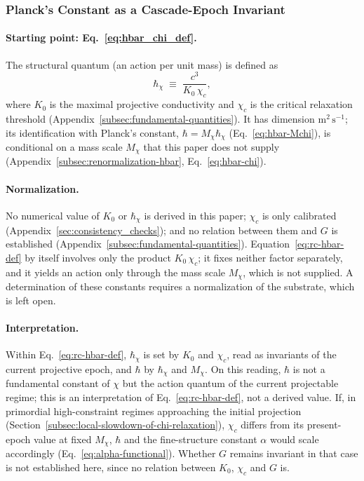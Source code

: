   \subsubsection*{Planck's Constant as a Cascade-Epoch Invariant}
    \label{sec:relax-cascade-hbar}

    \paragraph[Starting point: Eq. hbar-chi-def]{Starting point: Eq.~\eqref{eq:hbar_chi_def}.}
      The structural quantum (an action per unit mass) is defined as
    \begin{equation}
      \label{eq:rc-hbar-def}
      \hbar_\chi
      \;\equiv\;
      \frac{c^3}{K_0\,\chi_c},
      \end{equation}
      where $K_0$ is the maximal projective conductivity and $\chi_c$ is the
      critical relaxation threshold (Appendix~\ref{subsec:fundamental-quantities}).
      It has dimension $\mathrm{m}^2\,\mathrm{s}^{-1}$; its identification with Planck's constant,
      $\hbar = M_\chi\hbar_\chi$ (Eq.~\eqref{eq:hbar-Mchi}), is conditional on a mass scale $M_\chi$ that this paper
      does not supply (Appendix~\ref{subsec:renormalization-hbar}, Eq.~\eqref{eq:hbar-chi}).

    \paragraph{Normalization.}
      No numerical value of $K_0$ or $\hbar_\chi$ is derived in this paper; $\chi_c$ is only calibrated
      (Appendix~\ref{sec:consistency_checks}); and no relation between
      them and $G$ is established (Appendix~\ref{subsec:fundamental-quantities}).
      Equation~\eqref{eq:rc-hbar-def} by itself involves only the product $K_0\,\chi_c$; it fixes neither factor
      separately, and it yields an action only through the mass scale $M_\chi$, which is not supplied.
      A determination of these constants requires a normalization of the substrate, which is left open.

    \paragraph{Interpretation.}
      Within Eq.~\eqref{eq:rc-hbar-def}, $\hbar_\chi$ is set by $K_0$ and $\chi_c$, read as invariants of the
      current projective epoch, and $\hbar$ by $\hbar_\chi$ and $M_\chi$.
      On this reading, $\hbar$ is not a fundamental constant of $\chi$ but the action quantum of the current
      projectable regime; this is an interpretation of Eq.~\eqref{eq:rc-hbar-def}, not a derived value.
      If, in primordial high-constraint regimes approaching the initial projection
      (Section~\ref{subsec:local-slowdown-of-chi-relaxation}), $\chi_c$ differs from its present-epoch value
      at fixed $M_\chi$,
      $\hbar$ and the fine-structure constant $\alpha$ would scale accordingly (Eq.~\eqref{eq:alpha-functional}).
      Whether $G$ remains invariant in that case is not established here, since no relation between $K_0$,
      $\chi_c$ and $G$ is.

